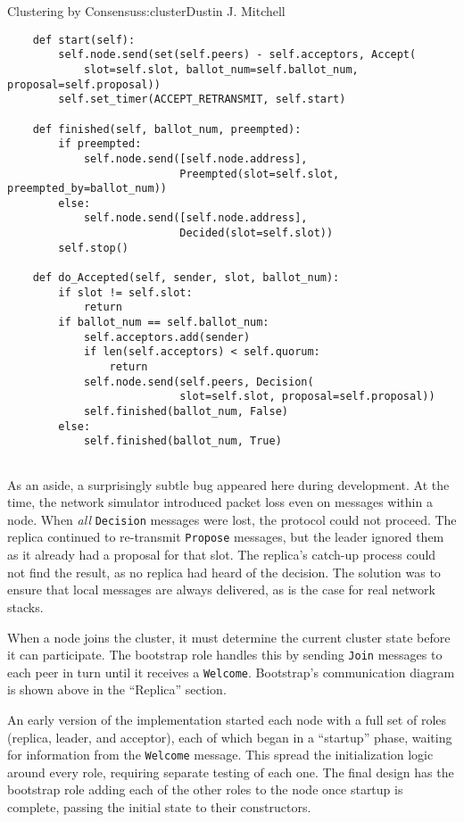 \begin{aosachapter}{Clustering by Consensus}{s:cluster}{Dustin J. Mitchell}
\begin{verbatim}
    def start(self):
        self.node.send(set(self.peers) - self.acceptors, Accept(
            slot=self.slot, ballot_num=self.ballot_num, proposal=self.proposal))
        self.set_timer(ACCEPT_RETRANSMIT, self.start)

    def finished(self, ballot_num, preempted):
        if preempted:
            self.node.send([self.node.address], 
                           Preempted(slot=self.slot, preempted_by=ballot_num))
        else:
            self.node.send([self.node.address], 
                           Decided(slot=self.slot))
        self.stop()

    def do_Accepted(self, sender, slot, ballot_num):
        if slot != self.slot:
            return
        if ballot_num == self.ballot_num:
            self.acceptors.add(sender)
            if len(self.acceptors) < self.quorum:
                return
            self.node.send(self.peers, Decision(
                           slot=self.slot, proposal=self.proposal))
            self.finished(ballot_num, False)
        else:
            self.finished(ballot_num, True)
    
\end{verbatim}

As an aside, a surprisingly subtle bug appeared here during development.
At the time, the network simulator introduced packet loss even on
messages within a node. When \emph{all} \texttt{Decision} messages were
lost, the protocol could not proceed. The replica continued to
re-transmit \texttt{Propose} messages, but the leader ignored them as it
already had a proposal for that slot. The replica's catch-up process
could not find the result, as no replica had heard of the decision. The
solution was to ensure that local messages are always delivered, as is
the case for real network stacks.

\label{bootstrap}

When a node joins the cluster, it must determine the current cluster
state before it can participate. The bootstrap role handles this by
sending \texttt{Join} messages to each peer in turn until it receives a
\texttt{Welcome}. Bootstrap's communication diagram is shown above in
the ``Replica'' section.

An early version of the implementation started each node with a full set
of roles (replica, leader, and acceptor), each of which began in a
``startup'' phase, waiting for information from the \texttt{Welcome}
message. This spread the initialization logic around every role,
requiring separate testing of each one. The final design has the
bootstrap role adding each of the other roles to the node once startup
is complete, passing the initial state to their constructors.


\end{aosachapter}
